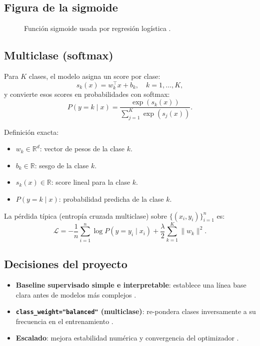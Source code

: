 \documentclass[12pt,oneside]{report}
\newcommand{\R}{\mathbb{R}}
\newcommand{\sigmoid}{\sigma}
\begin{document}
\subsection{Figura de la sigmoide}
\begin{figure}[H]
\centering
{}
\caption{Función sigmoide usada por regresión logística \cite{islr_logreg}.}
\label{fig:sigmoid}
\end{figure}

\subsection{Multiclase (softmax)}
Para $K$ clases, el modelo asigna un score por clase:
\[
s_k(x)=w_k^\top x + b_k, \quad k=1,\dots,K,
\]
y convierte esos scores en probabilidades con softmax:
\[
P(y=k\mid x)=\frac{\exp(s_k(x))}{\sum_{j=1}^K \exp(s_j(x))}.
\]

Definición exacta:
\begin{itemize}[leftmargin=*]
  \item $w_k \in \R^d$: vector de pesos de la clase $k$.
  \item $b_k \in \R$: sesgo de la clase $k$.
  \item $s_k(x)\in\R$: score lineal para la clase $k$.
  \item $P(y=k\mid x)$: probabilidad predicha de la clase $k$.
\end{itemize}

La pérdida típica (entropía cruzada multiclase) sobre $\{(x_i,y_i)\}_{i=1}^n$ es:
\[
\mathcal{L} = -\frac{1}{n}\sum_{i=1}^n \log P(y=y_i\mid x_i) + \frac{\lambda}{2}\sum_{k=1}^K \lVert w_k\rVert^2.
\]

\subsection{Decisiones del proyecto}
\begin{itemize}[leftmargin=*]
  \item \textbf{Baseline supervisado simple e interpretable}: establece una línea base clara antes de modelos más complejos \cite{islr_logreg}.
  \item \textbf{\texttt{class\_weight="balanced"} (multiclase)}: re-pondera clases inversamente a su frecuencia en el entrenamiento \cite{sklearn_logreg}.
  \item \textbf{Escalado}: mejora estabilidad numérica y convergencia del optimizador \cite{sklearn_logreg}.
\end{itemize}
\end{document}
